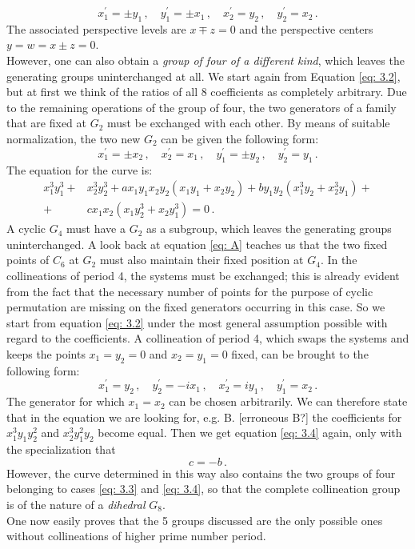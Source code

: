 \documentclass[leqno]{article}
\begin{document}
\[
x_1^\prime = \pm y_1 \, , \quad y_1^\prime = \pm x_1 \, , \quad x_2^\prime = y_2 \, , \quad y_2^\prime = x_2 \, .
\]
The associated perspective levels are $x \mp z = 0$ and the perspective centers $y=w = x \pm z=0$. \\
However, one can also obtain a \textit{group of four of a different kind}, which leaves the generating groups uninterchanged at all. We start again from Equation \eqref{eq: 3.2}, but at first we think of the ratios of all 8 coefficients as completely arbitrary. Due to the remaining operations of the group of four, the two generators of a family that are fixed at $G_2$ must be exchanged with each other. By means of suitable normalization, the two new $G_2$ can be given the following form:
\[
x_1^\prime = \pm x_2 \, , \quad x_2^\prime = x_1 \, , \quad y_1^\prime = \pm y_2 \, , \quad y_2^\prime = y_1 \, .
\]
The equation for the curve is:
\begin{align}\label{eq: 3.4}
	x_1^3 y_1^3 +& x_2^3 y_2^3 + ax_1 y_1 x_2 y_2 (x_1 y_1 + x_2 y_2) + b y_1 y_2 (x_1^3 y_2 + x_2^3 y_1) + \tag{4} \\ 
	+& c x_1 x_2 (x_1 y_2^3 + x_2 y_1^3) = 0 \, .  \nonumber 
\end{align}
A cyclic $G_4$ must have a $G_2$ as a subgroup, which leaves the generating groups uninterchanged. A look back at equation \eqref{eq: A} teaches us that the two fixed points of $C_6$ at $G_2$ must also maintain their fixed position at $G_4$. In the collineations of period 4, the systems must be exchanged; this is already evident from the fact that the necessary number of points for the purpose of cyclic permutation are missing on the fixed generators occurring in this case. So we start from equation \eqref{eq: 3.2} under the most general assumption possible with regard to the coefficients. A collineation of period 4, which swaps the systems and keeps the points $x_1 = y_2 =0$ and $x_2 = y_1 = 0$ fixed, can be brought to the following form:
\[
x_1^\prime = y_2 \, , \quad y_2^\prime = -ix_1 \, , \quad x_2^\prime = iy_1 \, , \quad y_1^\prime = x_2 \, .
\]
 The generator for which $x_1=x_2$ can be chosen arbitrarily. We can therefore state that in the equation we are looking for, e.g. B. [erroneous B?] the coefficients for $x_1^3 y_1 y_2^2$ and $x_2^3 y_1^2 y_2$ become equal. Then we get equation \eqref{eq: 3.4} again, only with the specialization that
\begin{equation}\label{eq: 3.5}
c = -b \, . \tag{5} 
\end{equation}
However, the curve determined in this way also contains the two groups of four belonging to cases \eqref{eq: 3.3} and \eqref{eq: 3.4}, so that the complete collineation group is of the nature of a \textit{dihedral} $G_8$. \\
One now easily proves that the 5 groups discussed are the only possible ones without collineations of higher prime number period.
\end{document}

